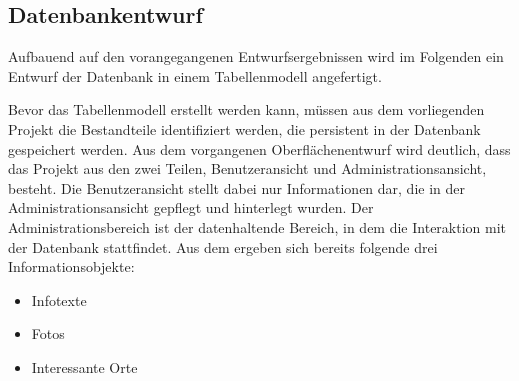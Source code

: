 \subsection{Datenbankentwurf}
\label{sec:Datenbankentwurf}

Aufbauend auf den vorangegangenen Entwurfsergebnissen wird im Folgenden ein Entwurf der Datenbank in einem Tabellenmodell angefertigt.\footnotemark


Bevor das Tabellenmodell erstellt werden kann, müssen aus dem vorliegenden Projekt die Bestandteile identifiziert werden, die persistent in der Datenbank gespeichert werden.
Aus dem vorgangenen Oberflächenentwurf wird deutlich, dass das Projekt aus den zwei Teilen, Benutzeransicht und Administrationsansicht, besteht.
Die Benutzeransicht stellt dabei nur Informationen dar, die in der Administrationsansicht gepflegt und hinterlegt wurden. Der Administrationsbereich ist der datenhaltende Bereich, in dem die Interaktion mit der Datenbank stattfindet. 
Aus dem  ergeben sich bereits folgende drei Informationsobjekte:

\begin{itemize}
  \item Infotexte
  \item Fotos
  \item Interessante Orte
\end{itemize}

